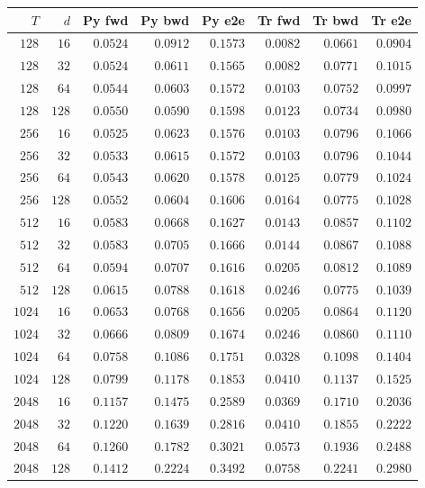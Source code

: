 \begin{tabular}{rrrrrrrr}
\toprule
$T$ & $d$ & Py fwd & Py bwd & Py e2e & Tr fwd & Tr bwd & Tr e2e \\
\midrule
${128}$ & ${16}$ & $0.0524$ & $0.0912$ & $0.1573$ & $0.0082$ & $0.0661$ & $0.0904$ \\
${128}$ & ${32}$ & $0.0524$ & $0.0611$ & $0.1565$ & $0.0082$ & $0.0771$ & $0.1015$ \\
${128}$ & ${64}$ & $0.0544$ & $0.0603$ & $0.1572$ & $0.0103$ & $0.0752$ & $0.0997$ \\
${128}$ & ${128}$ & $0.0550$ & $0.0590$ & $0.1598$ & $0.0123$ & $0.0734$ & $0.0980$ \\
${256}$ & ${16}$ & $0.0525$ & $0.0623$ & $0.1576$ & $0.0103$ & $0.0796$ & $0.1066$ \\
${256}$ & ${32}$ & $0.0533$ & $0.0615$ & $0.1572$ & $0.0103$ & $0.0796$ & $0.1044$ \\
${256}$ & ${64}$ & $0.0543$ & $0.0620$ & $0.1578$ & $0.0125$ & $0.0779$ & $0.1024$ \\
${256}$ & ${128}$ & $0.0552$ & $0.0604$ & $0.1606$ & $0.0164$ & $0.0775$ & $0.1028$ \\
${512}$ & ${16}$ & $0.0583$ & $0.0668$ & $0.1627$ & $0.0143$ & $0.0857$ & $0.1102$ \\
${512}$ & ${32}$ & $0.0583$ & $0.0705$ & $0.1666$ & $0.0144$ & $0.0867$ & $0.1088$ \\
${512}$ & ${64}$ & $0.0594$ & $0.0707$ & $0.1616$ & $0.0205$ & $0.0812$ & $0.1089$ \\
${512}$ & ${128}$ & $0.0615$ & $0.0788$ & $0.1618$ & $0.0246$ & $0.0775$ & $0.1039$ \\
${1024}$ & ${16}$ & $0.0653$ & $0.0768$ & $0.1656$ & $0.0205$ & $0.0864$ & $0.1120$ \\
${1024}$ & ${32}$ & $0.0666$ & $0.0809$ & $0.1674$ & $0.0246$ & $0.0860$ & $0.1110$ \\
${1024}$ & ${64}$ & $0.0758$ & $0.1086$ & $0.1751$ & $0.0328$ & $0.1098$ & $0.1404$ \\
${1024}$ & ${128}$ & $0.0799$ & $0.1178$ & $0.1853$ & $0.0410$ & $0.1137$ & $0.1525$ \\
${2048}$ & ${16}$ & $0.1157$ & $0.1475$ & $0.2589$ & $0.0369$ & $0.1710$ & $0.2036$ \\
${2048}$ & ${32}$ & $0.1220$ & $0.1639$ & $0.2816$ & $0.0410$ & $0.1855$ & $0.2222$ \\
${2048}$ & ${64}$ & $0.1260$ & $0.1782$ & $0.3021$ & $0.0573$ & $0.1936$ & $0.2488$ \\
${2048}$ & ${128}$ & $0.1412$ & $0.2224$ & $0.3492$ & $0.0758$ & $0.2241$ & $0.2980$ \\

\end{tabular}
